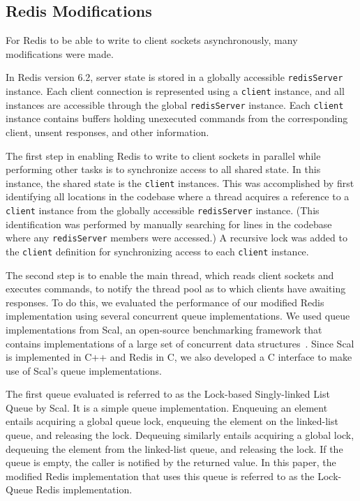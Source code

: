 \documentclass[sigconf, screen]{acmart}
\newcommand{\inlinecode}[1]{\texttt{#1}}
\begin{document}
\subsection{Redis Modifications}
For Redis to be able to write to client sockets asynchronously, many modifications were made.

In Redis version 6.2, server state is stored in a globally accessible \inlinecode{redisServer} instance.
Each client connection is represented using a \inlinecode{client} instance, and all instances are accessible through the global \inlinecode{redisServer} instance.
Each \inlinecode{client} instance contains buffers holding unexecuted commands from the corresponding client, unsent responses, and other information.

The first step in enabling Redis to write to client sockets in parallel while performing other tasks is to synchronize access to all shared state.
In this instance, the shared state is the \inlinecode{client} instances.
This was accomplished by first identifying all locations in the codebase where a thread acquires a reference to a \inlinecode{client} instance from the globally accessible \inlinecode{redisServer} instance.
(This identification was performed by manually searching for lines in the codebase where any \inlinecode{redisServer} members were accessed.)
A recursive lock was added to the \inlinecode{client} definition for synchronizing access to each \inlinecode{client} instance.

The second step is to enable the main thread, which reads client sockets and executes commands, to notify the thread pool as to which clients have awaiting responses.
To do this, we evaluated the performance of our modified Redis implementation using several concurrent queue implementations.
We used queue implementations from Scal, an open-source benchmarking framework that contains implementations of a large set of concurrent data structures~\cite{scal-paper}.
Since Scal is implemented in C++ and Redis in C, we also developed a C interface to make use of Scal's queue implementations.

The first queue evaluated is referred to as the Lock-based Singly-linked List Queue by Scal.
It is a simple queue implementation.
Enqueuing an element entails acquiring a global queue lock, enqueuing the element on the linked-list queue, and releasing the lock.
Dequeuing similarly entails acquiring a global lock, dequeuing the element from the linked-list queue, and releasing the lock.
If the queue is empty, the caller is notified by the returned value.
In this paper, the modified Redis implementation that uses this queue is referred to as the Lock-Queue Redis implementation.
\end{document}
